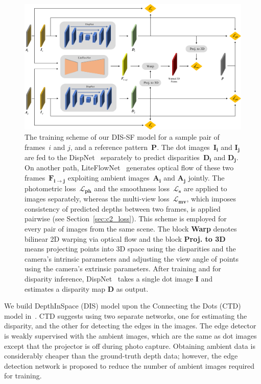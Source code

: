 \begin{figure}[t]
    \begin{center}
        \includegraphics[width=1.0\linewidth]{images/chapter2/figures/Fig1.jpg}
    \end{center}
   \caption{The training scheme of our DIS-SF model for a sample pair of frames~$i$ and $j$, and a reference pattern~$\boldsymbol{P}$. The dot images~$\boldsymbol{I_i}$ and $\boldsymbol{I_j}$ are fed to the DispNet~\citep{mayer2016large} separately to predict disparities~$\boldsymbol{D_i}$ and $\boldsymbol{D_j}$. On another path, LiteFlowNet~\citep{hui2018liteflownet} generates optical flow of these two frames~$\boldsymbol{F_{i \rightarrow j}}$ exploiting ambient images~$\boldsymbol{A_i}$ and $\boldsymbol{A_j}$ jointly. The photometric loss~$\boldsymbol{\mathcal{L}_{ph}}$ and the smoothness loss~$\boldsymbol{\mathcal{L}_s}$ are applied to images separately, whereas the multi-view loss~$\boldsymbol{\mathcal{L}_{mv}}$, which imposes consistency of predicted depths between two frames, is applied pairwise (see Section~\ref{sec:c2_loss}). This scheme is employed for every pair of images from the same scene. The block \textbf{Warp} denotes bilinear 2D warping via optical flow and the block \textbf{Proj. to 3D} means projecting points into 3D space using the disparities and the camera's intrinsic parameters and adjusting the view angle of points using the camera's extrinsic parameters. After training and for disparity inference, DispNet~\citep{mayer2016large} takes a single dot image $\boldsymbol{I}$ and estimates a disparity map $\boldsymbol{D}$ as output.}
    \label{fig:c2_single}
\end{figure}

We build DepthInSpace (DIS) model upon the Connecting the Dots (CTD) model in~\cite{riegler2019connecting}. CTD suggests using two separate networks, one for estimating the disparity, and the other for detecting the edges in the images. The edge detector is weakly supervised with the ambient images, which are the same as dot images except that the projector is off during photo capture. Obtaining ambient data is considerably cheaper than the ground-truth depth data; however, the edge detection network is proposed to reduce the number of ambient images required for training.

